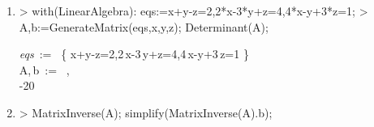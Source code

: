 \begin{enumerate}
\item
\begin{MapleInput}
> with(LinearAlgebra): eqs:={x+y-z=2,2*x-3*y+z=4,4*x-y+3*z=1};
> A,b:=GenerateMatrix(eqs,{x,y,z}); Determinant(A);
\end{MapleInput}
\begin{MapleOutputGather}
{\it eqs}\, := \, \left\{ x+y-z=2,2\,x-3\,y+z=4,4\,x-y+3\,z=1 \right\}  \notag \\
A,\,b\, := \,  ,\, \left[ \begin {array}{c} 2\\  4\\  1\end {array} \right]\notag \\
-20\notag 
\end{MapleOutputGather}

\item
\begin{MapleInput}
> MatrixInverse(A); simplify(MatrixInverse(A).b);
\end{MapleInput}
\begin{MapleOutputGather}
 \notag \\
\notag 
\end{MapleOutputGather}
\end{enumerate}